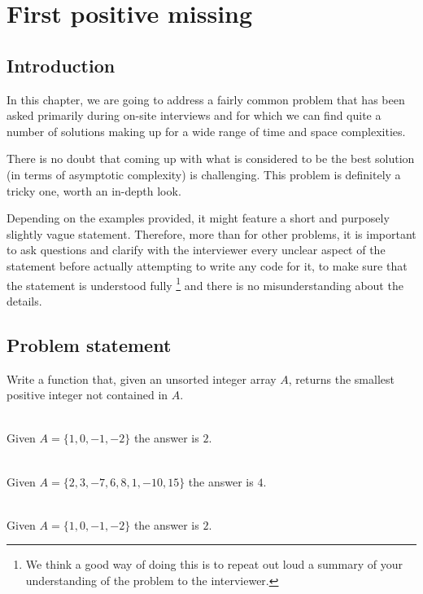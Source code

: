 %

\chapter{First positive missing}
\label{ch:first_positive_missing}
\section*{Introduction}

In this chapter, we are going to address a fairly common problem that has been asked primarily during on-site interviews and for which we can find quite a number of solutions making up for a wide range of time and space complexities.

There is no doubt that coming up with what is considered to be the best solution (in terms of asymptotic complexity) is challenging. This problem is definitely a tricky one, worth an in-depth look.

Depending on the examples provided, it might feature a short and purposely slightly vague statement.
Therefore, more than for other problems, it is important to ask questions and clarify with the interviewer every unclear aspect of the statement before actually attempting to write any code for it, to make sure that the statement is understood fully \footnote{ We think a good way of doing this is to repeat out loud a summary of your understanding of the problem to the interviewer.}  and there is no misunderstanding about the details.

\section{Problem statement}
\begin{exercise}
	Write a function that, given an unsorted integer array $A$, returns the smallest positive integer not contained in $A$.

	\begin{example}
		\hfill \\
		Given $A=\{ 1, 0, -1, -2\}$ the answer is $2$.
	\end{example}
	
	\begin{example}
		\hfill \\
		Given $A=\{ 2, 3, -7, 6, 8, 1, -10, 15\}$ the answer is $4$.
	\end{example}
	
	\begin{example}
		\hfill \\
		Given $A=\{ 1, 0, -1, -2\}$ the answer is $2$.
	\end{example}
\end{exercise}
	
